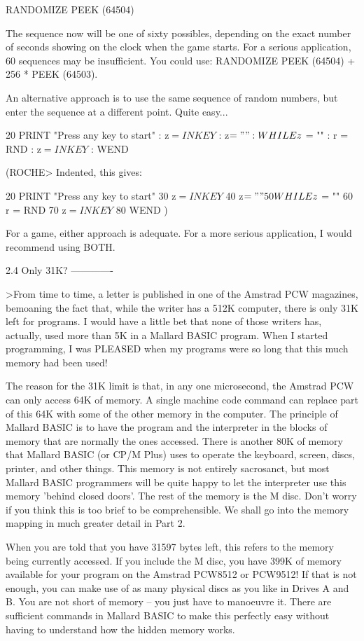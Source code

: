         RANDOMIZE PEEK (64504)

The sequence now will be one of sixty possibles, depending on the exact number 
of  seconds  showing  on  the  clock when  the  game  starts.  For  a  serious 
application,  60 sequences may be insufficient. You could use: RANDOMIZE  PEEK 
(64504) + 256 * PEEK (64503).

An  alternative  approach is to use the same sequence of random  numbers,  but 
enter the sequence at a different point. Quite easy...

        20 PRINT "Press any key to start" : z$ = INKEY$ : z$ = "" : WHILE z$ = 
"" : r = RND : z$ = INKEY$ : WEND

(ROCHE> Indented, this gives:

        20 PRINT "Press any key to start"
        30 z$ = INKEY$
        40 z$ = ""
        50 WHILE z$ = ""
        60       r = RND
        70       z$ = INKEY$
        80 WEND
)

For  a  game, either approach is adequate. For a more serious  application,  I 
would recommend using BOTH.


2.4 Only 31K?
-------------

>From time to time, a letter is published in one of the Amstrad PCW  magazines, 
bemoaning  the fact that, while the writer has a 512K computer, there is  only 
31K  left for programs. I would have a little bet that none of  those  writers 
has,  actually, used more than 5K in a Mallard BASIC program. When  I  started 
programming, I was PLEASED when my programs were so long that this much memory 
had been used!

The reason for the 31K limit is that, in any one microsecond, the Amstrad  PCW 
can only access 64K of memory. A single machine code command can replace  part 
of  this 64K with some of the other memory in the computer. The  principle  of 
Mallard  BASIC  is to have the program and the interpreter in  the  blocks  of 
memory  that  are normally the ones accessed. There is another 80K  of  memory 
that Mallard BASIC (or CP/M Plus) uses to operate the keyboard, screen, discs, 
printer,  and other things. This memory is not entirely sacrosanct,  but  most 
Mallard BASIC programmers will be quite happy to let the interpreter use  this 
memory  'behind  closed doors'. The rest of the memory is the  M  disc.  Don't 
worry  if you think this is too brief to be comprehensible. We shall  go  into 
the memory mapping in much greater detail in Part 2.

When  you are told that you have 31597 bytes left, this refers to  the  memory 
being  currently accessed. If you include the M disc, you have 399K of  memory 
available  for your program on the Amstrad PCW8512 or PCW9512! If that is  not 
enough, you can make use of as many physical discs as you like in Drives A and 
B.  You  are not short of memory -- you just have to manoeuvre it.  There  are 
sufficient  commands  in  Mallard BASIC to make this  perfectly  easy  without 
having to understand how the hidden memory works.

